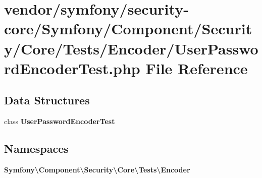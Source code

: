 \section{vendor/symfony/security-\/core/\+Symfony/\+Component/\+Security/\+Core/\+Tests/\+Encoder/\+User\+Password\+Encoder\+Test.php File Reference}
\label{_user_password_encoder_test_8php}
\subsection*{Data Structures}
\begin{DoxyCompactItemize}
\item 
class {\bf User\+Password\+Encoder\+Test}
\end{DoxyCompactItemize}
\subsection*{Namespaces}
\begin{DoxyCompactItemize}
\item 
 {\bf Symfony\textbackslash{}\+Component\textbackslash{}\+Security\textbackslash{}\+Core\textbackslash{}\+Tests\textbackslash{}\+Encoder}
\end{DoxyCompactItemize}
